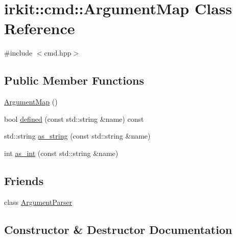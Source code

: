 \hypertarget{classirkit_1_1cmd_1_1ArgumentMap}{}\section{irkit\+:\+:cmd\+:\+:Argument\+Map Class Reference}
\label{classirkit_1_1cmd_1_1ArgumentMap}


{\ttfamily \#include $<$cmd.\+hpp$>$}

\subsection*{Public Member Functions}
\begin{DoxyCompactItemize}
\item 
\mbox{\hyperlink{classirkit_1_1cmd_1_1ArgumentMap_a0e49c24e5f569754240f3e7b652357ff}{Argument\+Map}} ()
\item 
bool \mbox{\hyperlink{classirkit_1_1cmd_1_1ArgumentMap_a37cc1269cc6c393fb0786fcd40325afb}{defined}} (const std\+::string \&name) const
\item 
std\+::string \mbox{\hyperlink{classirkit_1_1cmd_1_1ArgumentMap_ae53ee1be0415ee233747c4103dd33304}{as\+\_\+string}} (const std\+::string \&name)
\item 
int \mbox{\hyperlink{classirkit_1_1cmd_1_1ArgumentMap_ab2b7591f8e6838d32bafc32d79adda9f}{as\+\_\+int}} (const std\+::string \&name)
\end{DoxyCompactItemize}
\subsection*{Friends}
\begin{DoxyCompactItemize}
\item 
class \mbox{\hyperlink{classirkit_1_1cmd_1_1ArgumentMap_a55c9e1ac006a645af402e3aee6b64e00}{Argument\+Parser}}
\end{DoxyCompactItemize}


\subsection{Constructor \& Destructor Documentation}
\mbox{\label{classirkit_1_1cmd_1_1ArgumentMap_a0e49c24e5f569754240f3e7b652357ff}} 
